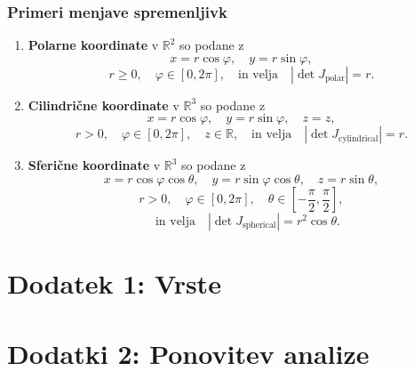 \documentclass{article}
\begin{document}
\begin{multicols}{2}
\subsubsection{Primeri menjave spremenljivk}

\begin{enumerate}
\item \textbf{Polarne koordinate} v \( \mathbb{R}^2 \) so podane z
\[ 
x = r \cos \varphi, \quad y = r \sin \varphi, 
\]
\[ 
r \geq 0, \quad \varphi \in [0, 2\pi], \quad \text{in velja} \quad |\det J_{\text{polar}}| = r.
\]

\item \textbf{Cilindrične koordinate} v \( \mathbb{R}^3 \) so podane z
\[ 
x = r \cos \varphi, \quad y = r \sin \varphi, \quad z = z, 
\]
\[ 
r > 0, \quad \varphi \in [0, 2\pi], \quad z \in \mathbb{R}, \quad \text{in velja} \quad |\det J_{\text{cylindrical}}| = r.
\]

\item \textbf{Sferične koordinate} v \( \mathbb{R}^3 \) so podane z
\[ 
x = r \cos \varphi \cos \theta, \quad y = r \sin \varphi \cos \theta, \quad z = r \sin \theta,
\]
\[ 
r > 0, \quad \varphi \in [0, 2\pi], \quad \theta \in \left[-\frac{\pi}{2}, \frac{\pi}{2}\right], 
\]
\[
\quad \text{in velja} \quad |\det J_{\text{spherical}}| = r^2 \cos \theta.
\]
\end{enumerate}

\section{Dodatek 1: Vrste}



\section{Dodatki 2: Ponovitev analize}



\end{multicols}
\end{document}
